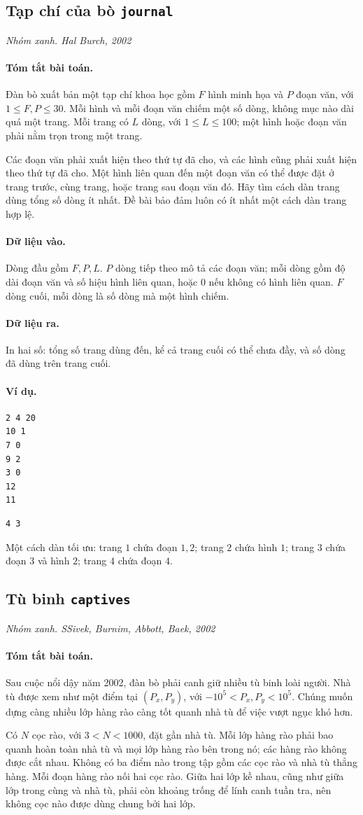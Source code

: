 \documentclass[11pt]{article}
\newcommand{\problem}[4]{%
  \subsection[#1 (#2)]{#1 \hfill {\normalsize\texttt{#2}}}%
  \noindent\textit{#3. #4}\par\smallskip
}
\newcommand{\iosec}[1]{\paragraph{#1}}
\begin{document}
\problem{Tạp chí của bò}{journal}{Nhóm xanh}{Hal Burch, 2002}

\iosec{Tóm tắt bài toán.}
Đàn bò xuất bản một tạp chí khoa học gồm \(F\) hình minh họa và \(P\) đoạn văn,
với \(1\le F,P\le 30\). Mỗi hình và mỗi đoạn văn chiếm một số dòng, không mục
nào dài quá một trang. Mỗi trang có \(L\) dòng, với \(1\le L\le 100\); một
hình hoặc đoạn văn phải nằm trọn trong một trang.

Các đoạn văn phải xuất hiện theo thứ tự đã cho, và các hình cũng phải xuất
hiện theo thứ tự đã cho. Một hình liên quan đến một đoạn văn có thể được đặt ở
trang trước, cùng trang, hoặc trang sau đoạn văn đó. Hãy tìm cách dàn trang
dùng tổng số dòng ít nhất. Đề bài bảo đảm luôn có ít nhất một cách dàn trang
hợp lệ.

\iosec{Dữ liệu vào.}
Dòng đầu gồm \(F,P,L\). \(P\) dòng tiếp theo mô tả các đoạn văn; mỗi dòng gồm
độ dài đoạn văn và số hiệu hình liên quan, hoặc \(0\) nếu không có hình liên
quan. \(F\) dòng cuối, mỗi dòng là số dòng mà một hình chiếm.

\iosec{Dữ liệu ra.}
In hai số: tổng số trang dùng đến, kể cả trang cuối có thể chưa đầy, và số
dòng đã dùng trên trang cuối.

\iosec{Ví dụ.}
\begin{verbatim}
2 4 20
10 1
7 0
9 2
3 0
12
11
\end{verbatim}

\begin{verbatim}
4 3
\end{verbatim}

Một cách dàn tối ưu: trang \(1\) chứa đoạn \(1,2\); trang \(2\) chứa hình
\(1\); trang \(3\) chứa đoạn \(3\) và hình \(2\); trang \(4\) chứa đoạn \(4\).

\problem{Tù binh}{captives}{Nhóm xanh}{SSivek, Burnim, Abbott, Baek, 2002}

\iosec{Tóm tắt bài toán.}
Sau cuộc nổi dậy năm 2002, đàn bò phải canh giữ nhiều tù binh loài người. Nhà
tù được xem như một điểm tại \((P_x,P_y)\), với
\(-10^5<P_x,P_y<10^5\). Chúng muốn dựng càng nhiều lớp hàng rào càng tốt quanh
nhà tù để việc vượt ngục khó hơn.

Có \(N\) cọc rào, với \(3<N<1000\), đặt gần nhà tù. Mỗi lớp hàng rào phải bao
quanh hoàn toàn nhà tù và mọi lớp hàng rào bên trong nó; các hàng rào không
được cắt nhau. Không có ba điểm nào trong tập gồm các cọc rào và nhà tù thẳng
hàng. Mỗi đoạn hàng rào nối hai cọc rào. Giữa hai lớp kề nhau, cũng như giữa
lớp trong cùng và nhà tù, phải còn khoảng trống để lính canh tuần tra, nên
không cọc nào được dùng chung bởi hai lớp.
\end{document}
